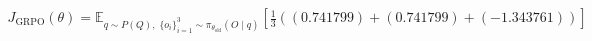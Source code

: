 \documentclass[preview]{standalone}
\begin{document}
\begin{align*}
J_{\text{GRPO}}(\theta) =  \mathbb{E}_{ q \sim P(Q) ,\;  \{o_i\}_{i=1}^3 \sim \pi_{\theta_{\text{old}}}(O \mid q)} \left[ \frac{1}{3} \left((0.741799)+(0.741799)+(-1.343761)\right) \right]
\end{align*}
\end{document}
